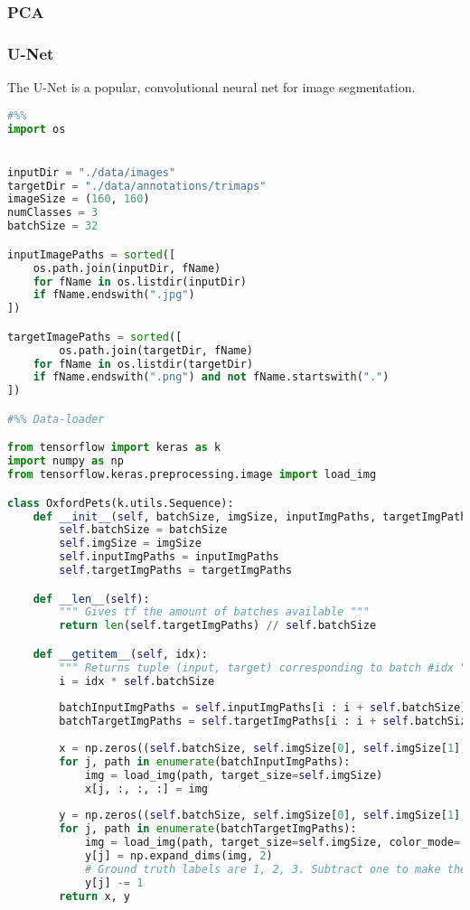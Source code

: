 \subsubsection{PCA}

\subsubsection{U-Net}
The U-Net is a popular, convolutional neural net for image segmentation.
\begin{lstlisting}[language=python]
#%%
import os


inputDir = "./data/images"
targetDir = "./data/annotations/trimaps"
imageSize = (160, 160)
numClasses = 3
batchSize = 32

inputImagePaths = sorted([
    os.path.join(inputDir, fName)
    for fName in os.listdir(inputDir)
    if fName.endswith(".jpg")
])

targetImagePaths = sorted([
        os.path.join(targetDir, fName)
    for fName in os.listdir(targetDir)
    if fName.endswith(".png") and not fName.startswith(".")
])

#%% Data-loader

from tensorflow import keras as k
import numpy as np
from tensorflow.keras.preprocessing.image import load_img

class OxfordPets(k.utils.Sequence):
    def __init__(self, batchSize, imgSize, inputImgPaths, targetImgPaths):
        self.batchSize = batchSize
        self.imgSize = imgSize
        self.inputImgPaths = inputImgPaths
        self.targetImgPaths = targetImgPaths

    def __len__(self):
        """ Gives tf the amount of batches available """
        return len(self.targetImgPaths) // self.batchSize

    def __getitem__(self, idx):
        """ Returns tuple (input, target) corresponding to batch #idx """
        i = idx * self.batchSize
        
        batchInputImgPaths = self.inputImgPaths[i : i + self.batchSize]
        batchTargetImgPaths = self.targetImgPaths[i : i + self.batchSize]
        
        x = np.zeros((self.batchSize, self.imgSize[0], self.imgSize[1], 3), dtype='float32')
        for j, path in enumerate(batchInputImgPaths):
            img = load_img(path, target_size=self.imgSize)
            x[j, :, :, :] = img
        
        y = np.zeros((self.batchSize, self.imgSize[0], self.imgSize[1], 1), dtype='uint8')
        for j, path in enumerate(batchTargetImgPaths):
            img = load_img(path, target_size=self.imgSize, color_mode='grayscale')
            y[j] = np.expand_dims(img, 2)
            # Ground truth labels are 1, 2, 3. Subtract one to make them 0, 1, 2:
            y[j] -= 1
        return x, y


\end{lstlisting}
